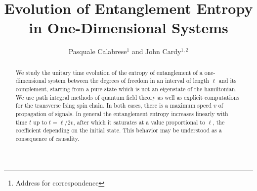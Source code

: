 



\def\be{\begin{equation}}
\def\ee{\end{equation}}

\def\bea{\begin{eqnarray}}
\def\eea{\end{eqnarray}}

\def\e{\epsilon}
\def\s{\sigma}
\def\o{\omega}
\def\p{\varphi}


\def\Fa{\hat{a}}
\def\Fb{\hat{b}}
\def\FB{\hat{B}}
\def\Fc{\hat{c}}
\def\Fd{\hat{d}}
\def\FD{\hat{D}}
\def\Fh{\hat{h}}
\def\Ma{\check{a}}
\def\Mc{\check{c}}

\newcommand{\ev}[1]{\mbox{$\langle #1 \rangle$}}













%
\title{Evolution of Entanglement Entropy in One-Dimensional Systems}
%
\author{Pasquale Calabrese$^1$ and John Cardy$^{1,2}$}
%
\address{$^1$Rudolf Peierls Centre for Theoretical Physics,
         1 Keble Road, Oxford OX1 3NP, U.K.\footnote{Address for
correspondence} \\
         $^2$All Souls College, Oxford.}
%
%
\maketitle
%
\begin{abstract}

We study the unitary time evolution of the entropy of entanglement of a 
one-dimensional system between the degrees of freedom in an interval of 
length  $\ell$ and its complement, starting from a pure state which is not
an eigenstate of the hamiltonian. 
We use path integral methods of quantum field theory as well as explicit 
computations for the transverse Ising spin chain. 
In both cases, there is a maximum speed $v$ of propagation of signals. 
In general the entanglement entropy increases linearly with time $t$ up 
to $t=\ell/2v$, after which it saturates at a value proportional to $\ell$,
the coefficient depending on the initial state.
This behavior may be understood as a consequence of causality.


\end{abstract}



